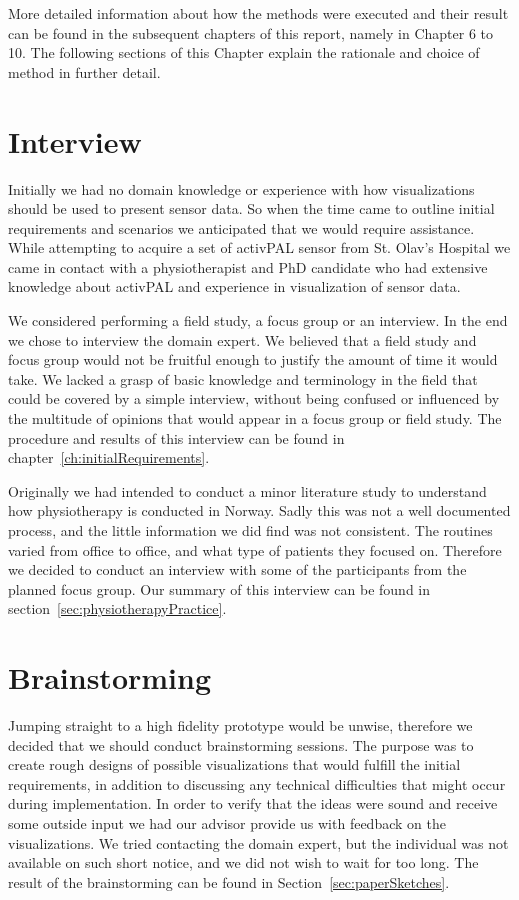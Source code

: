 More detailed information about how the methods were executed and their result can be found in the subsequent chapters of this report, namely in Chapter 6 to 10. The following sections of this Chapter explain the rationale and choice of method in further detail.
 
\section{Interview}
Initially we had no domain knowledge or experience with how visualizations should be used to present sensor data. So when the time came to outline initial requirements and scenarios we anticipated that we would require assistance. While attempting to acquire a set of activPAL sensor from St. Olav's Hospital we came in contact with a physiotherapist and PhD candidate who had extensive knowledge about activPAL and experience in visualization of sensor data. 

We considered performing a field study, a focus group or an interview. In the end we chose to interview the domain expert. We believed that a field study and focus group would not be fruitful enough to justify the amount of time it would take. We lacked a grasp of basic knowledge and terminology in the field that could be covered by a simple interview, without being confused or influenced by the multitude of opinions that would appear in a focus group or field study. The procedure and results of this interview can be found in chapter~\ref{ch:initialRequirements}. 

Originally we had intended to conduct a minor literature study to understand how physiotherapy is conducted in Norway. Sadly this was not a well documented process, and the little information we did find was not consistent. The routines varied from office to office, and what type of patients they focused on. Therefore we decided to conduct an interview with some of the participants from the planned focus group. Our summary of this interview can be found in section~\ref{sec:physiotherapyPractice}.
 
\section{Brainstorming}
Jumping straight to a high fidelity prototype would be unwise, therefore we decided that we should conduct brainstorming sessions. The purpose was to create rough designs of possible visualizations that would fulfill the initial requirements, in addition to discussing any technical difficulties that might occur during implementation. In order to verify that the ideas were sound and receive some outside input we had our advisor provide us with feedback on the visualizations. We tried contacting the domain expert, but the individual was not available on such short notice, and we did not wish to wait for too long. The result of the brainstorming can be found in Section~\ref{sec:paperSketches}.

